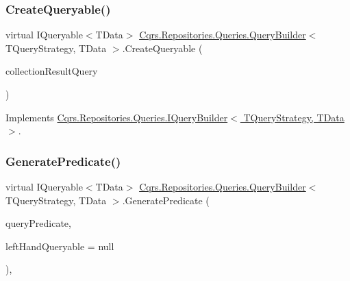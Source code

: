 \subsubsection{\texorpdfstring{Create\+Queryable()}{CreateQueryable()}\hspace{0.1cm}{\footnotesize\ttfamily [2/2]}}
{\footnotesize\ttfamily virtual I\+Queryable$<$T\+Data$>$ \hyperlink{classCqrs_1_1Repositories_1_1Queries_1_1QueryBuilder}{Cqrs.\+Repositories.\+Queries.\+Query\+Builder}$<$ T\+Query\+Strategy, T\+Data $>$.Create\+Queryable (\begin{DoxyParamCaption}\item[{\hyperlink{interfaceCqrs_1_1Repositories_1_1Queries_1_1ICollectionResultQuery}{I\+Collection\+Result\+Query}$<$ T\+Query\+Strategy, T\+Data $>$}]{collection\+Result\+Query }\end{DoxyParamCaption})\hspace{0.3cm}{\ttfamily [virtual]}}



Implements \hyperlink{interfaceCqrs_1_1Repositories_1_1Queries_1_1IQueryBuilder_ab903955b6fb1843a3e168b33252161a5_ab903955b6fb1843a3e168b33252161a5}{Cqrs.\+Repositories.\+Queries.\+I\+Query\+Builder$<$ T\+Query\+Strategy, T\+Data $>$}.

\mbox{\label{classCqrs_1_1Repositories_1_1Queries_1_1QueryBuilder_a553ad69e77d37f28b40e6c9d8e98b716_a553ad69e77d37f28b40e6c9d8e98b716}} 
\subsubsection{\texorpdfstring{Generate\+Predicate()}{GeneratePredicate()}\hspace{0.1cm}{\footnotesize\ttfamily [1/2]}}
{\footnotesize\ttfamily virtual I\+Queryable$<$T\+Data$>$ \hyperlink{classCqrs_1_1Repositories_1_1Queries_1_1QueryBuilder}{Cqrs.\+Repositories.\+Queries.\+Query\+Builder}$<$ T\+Query\+Strategy, T\+Data $>$.Generate\+Predicate (\begin{DoxyParamCaption}\item[{\hyperlink{interfaceCqrs_1_1Repositories_1_1Queries_1_1IQueryPredicate}{I\+Query\+Predicate}}]{query\+Predicate,  }\item[{I\+Queryable$<$ T\+Data $>$}]{left\+Hand\+Queryable = {\ttfamily null} }\end{DoxyParamCaption})\hspace{0.3cm}{\ttfamily [protected]}, {\ttfamily [virtual]}}

